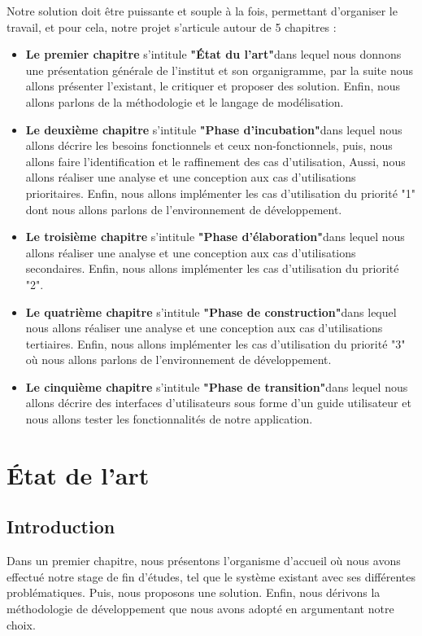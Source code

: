 \documentclass[12 pt ]{report}
\begin{document}
Notre solution doit être puissante et souple à la fois, permettant d'organiser le travail, et pour cela, notre projet s'articule autour de  5 chapitres :
\begin{itemize}[label=]
\item \textbf{Le premier chapitre} s'intitule\textbf{ "État du l'art"}dans lequel nous donnons une présentation générale de l'institut et son organigramme, par la suite nous allons présenter  l'existant, le critiquer et proposer des solution. Enfin, nous allons parlons de la méthodologie et le langage de modélisation.
\item \textbf{Le deuxième chapitre} s'intitule\textbf{ "Phase d'incubation"}dans lequel nous allons décrire les besoins fonctionnels et ceux non-fonctionnels, puis, nous allons faire l'identification et le raffinement des cas d'utilisation, Aussi, nous allons réaliser  une analyse et une conception aux cas d'utilisations prioritaires. Enfin, nous allons implémenter les cas d'utilisation du priorité "1" dont nous allons parlons de l'environnement de développement. 
\item \textbf{Le troisième chapitre} s'intitule\textbf{ "Phase d'élaboration"}dans lequel nous allons réaliser  une analyse et une conception aux cas d'utilisations secondaires. Enfin, nous allons implémenter les cas d'utilisation du priorité "2".
\item \textbf{Le quatrième chapitre} s'intitule\textbf{ "Phase de construction"}dans lequel nous allons réaliser  une analyse et une conception aux cas d'utilisations tertiaires. Enfin, nous allons implémenter les cas d'utilisation du priorité "3" où nous allons parlons de l'environnement de développement.
\item \textbf{Le cinquième chapitre} s'intitule\textbf{ "Phase de transition"}dans lequel nous allons décrire des interfaces d'utilisateurs sous forme d'un guide utilisateur et nous allons tester les fonctionnalités de notre application.


\end{itemize}


\newpage

\chapter{État de l'art}
\section*{Introduction}  
Dans un premier chapitre, nous présentons l’organisme d’accueil où nous avons effectué notre stage de fin d’études, tel que le système existant avec ses différentes problématiques.
Puis, nous proposons une solution. Enfin, nous dérivons la méthodologie de développement que nous avons adopté en argumentant notre choix.
\end{document}
